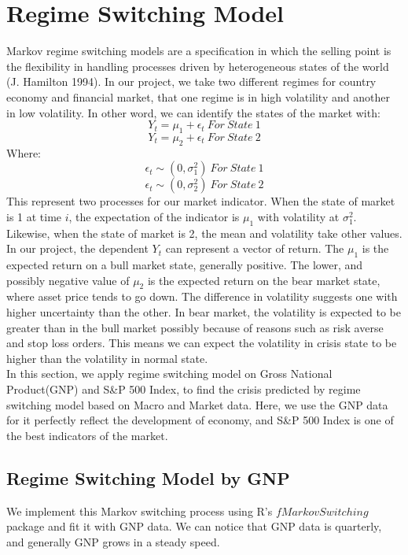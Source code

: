 \documentclass[12pt]{article}
\begin{document}
\pagestyle{fancyplain}
\cfoot{}
\section{Regime Switching Model}
Markov regime switching models are a specification in which the selling point is the flexibility in handling processes driven by heterogeneous states of the world (J. Hamilton 1994). In our project, we take two different regimes for country economy and financial market, that one regime is in high volatility and another in low volatility. In other word, we can identify the states of the market with:
$$
Y_t = \mu_1 + \epsilon_t \    For\ State\ 1
$$
$$
Y_t = \mu_2 + \epsilon_t \    For\ State\ 2
$$
Where:
$$
\epsilon_t \sim (0, \sigma_1^2) \    For\ State\ 1
$$$$
\epsilon_t \sim (0, \sigma_2^2) \    For\ State\ 2
$$
This represent two processes for our market indicator. When the state of market is 1 at time $i$, the expectation of the indicator is $\mu_1$ with volatility at $\sigma_1^2$. Likewise, when the state of market is 2, the mean and volatility take other values. In our project, the dependent $Y_t$ can represent a vector of return. The $\mu_1$ is the expected return on a bull market state, generally positive. The lower, and possibly negative value of $\mu_2$ is the expected return on the bear market state, where asset price tends to go down. The difference in volatility suggests one with higher uncertainty than the other. In bear market, the volatility is expected to be greater than in the bull market possibly because of reasons such as risk averse and stop loss orders. This means we can expect the volatility in crisis state to be higher than the volatility in normal state. \\

In this section, we apply regime switching model on Gross National Product(GNP) and S\&P 500 Index, to find the crisis predicted by regime switching model based on Macro and Market data. Here, we use the GNP data for it perfectly reflect the development of economy, and S\&P 500 Index is one of the best indicators of the market.


\subsection{Regime Switching Model by GNP}
We implement this Markov switching process using R’s $fMarkovSwitching$ package and fit it with GNP data. We can notice that GNP data is quarterly, and generally GNP grows in a steady speed.
\end{document}
